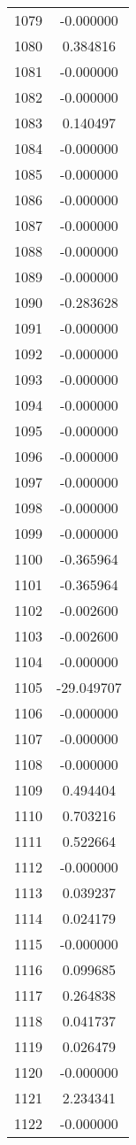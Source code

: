 \documentclass[12pt]{article}
\begin{document}
\begin{longtable}{@{}cc@{}}
1079 & -0.000000 \\
1080 & 0.384816 \\
1081 & -0.000000 \\
1082 & -0.000000 \\
1083 & 0.140497 \\
1084 & -0.000000 \\
1085 & -0.000000 \\
1086 & -0.000000 \\
1087 & -0.000000 \\
1088 & -0.000000 \\
1089 & -0.000000 \\
1090 & -0.283628 \\
1091 & -0.000000 \\
1092 & -0.000000 \\
1093 & -0.000000 \\
1094 & -0.000000 \\
1095 & -0.000000 \\
1096 & -0.000000 \\
1097 & -0.000000 \\
1098 & -0.000000 \\
1099 & -0.000000 \\
1100 & -0.365964 \\
1101 & -0.365964 \\
1102 & -0.002600 \\
1103 & -0.002600 \\
1104 & -0.000000 \\
1105 & -29.049707 \\
1106 & -0.000000 \\
1107 & -0.000000 \\
1108 & -0.000000 \\
1109 & 0.494404 \\
1110 & 0.703216 \\
1111 & 0.522664 \\
1112 & -0.000000 \\
1113 & 0.039237 \\
1114 & 0.024179 \\
1115 & -0.000000 \\
1116 & 0.099685 \\
1117 & 0.264838 \\
1118 & 0.041737 \\
1119 & 0.026479 \\
1120 & -0.000000 \\
1121 & 2.234341 \\
1122 & -0.000000 \\

\end{longtable}
\end{document}
